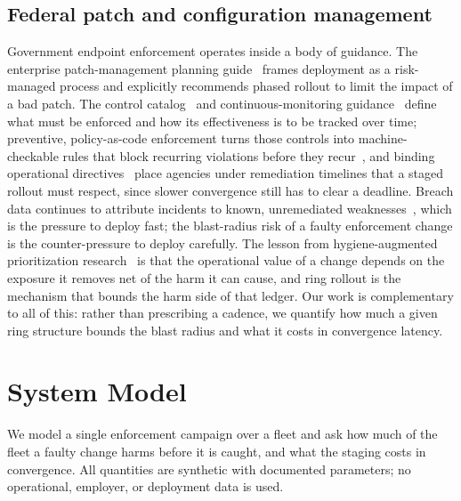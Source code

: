 \documentclass[journal]{IEEEtran}
\begin{document}
\subsection{Federal patch and configuration management}
Government endpoint enforcement operates inside a body of guidance. The enterprise patch-management
planning guide~\cite{nist2022sp80040r4} frames deployment as a risk-managed process and explicitly
recommends phased rollout to limit the impact of a bad patch. The control
catalog~\cite{nist80053} and continuous-monitoring guidance~\cite{nist80137} define what must be
enforced and how its effectiveness is to be tracked over time; preventive, policy-as-code enforcement
turns those controls into machine-checkable rules that block recurring violations before they
recur~\cite{paper13policy}, and binding operational
directives~\cite{cisabod2201} place agencies under remediation timelines that a staged rollout must
respect, since slower convergence still has to clear a deadline. Breach data continues to attribute
incidents to known, unremediated weaknesses~\cite{verizon2026dbir}, which is the pressure to deploy
fast; the blast-radius risk of a faulty enforcement change is the counter-pressure to deploy
carefully. The lesson from hygiene-augmented prioritization
research~\cite{paper4hygieneprio,paper1vulnprio} is that the operational value of a change depends on
the exposure it removes net of the harm it can cause, and ring rollout is the mechanism that bounds
the harm side of that ledger. Our work is complementary to all of this: rather than prescribing a
cadence, we quantify how much a given ring structure bounds the blast radius and what it costs in
convergence latency.

\section{System Model}
We model a single enforcement campaign over a fleet and ask how much of the fleet a faulty change
harms before it is caught, and what the staging costs in convergence. All quantities are synthetic
with documented parameters; no operational, employer, or deployment data is used.
\end{document}
